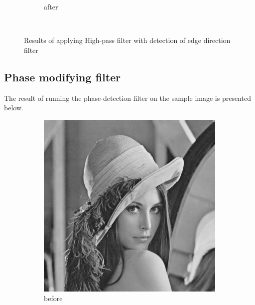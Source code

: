 \documentclass[12pt]{article}
\begin{document}
\begin{figure}[H]
\begin{subfigure}[t]{\subfiguresize}
        \caption{after}
    \end{subfigure}\\[1em]
    \caption{Results of applying High-pass filter with detection of edge direction filter }
\end{figure} 
\subsection{Phase modifying filter}
 The result of running the phase-detection filter on the sample image is presented below.
\begin{figure}[H]\centering
    \begin{subfigure}[t]{\subfiguresize}\centering
        \includegraphics[width=\textwidth]{img/lena.png}
        \caption{before}
    \end{subfigure}
    \hspace{2em}
    \begin{subfigure}[t]{\subfiguresize}\centering

\end{subfigure}
\end{figure}
\end{document}
